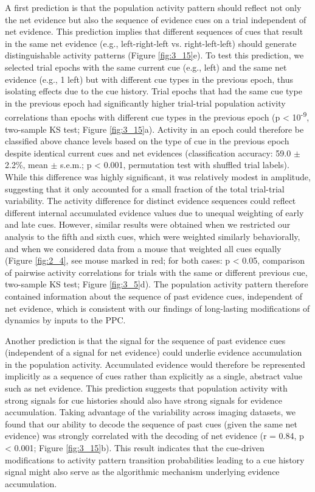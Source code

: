 \bigskip
A first prediction is that the population activity pattern should reflect not only the net evidence but also the sequence of evidence cues on a trial independent of net evidence. This prediction implies that different sequences of cues that result in the same net evidence (e.g., left-right-left vs. right-left-left) should generate distinguishable activity patterns (Figure \ref{fig:3_15}e). To test this prediction, we selected trial epochs with the same current cue (e.g., left) and the same net evidence (e.g., 1 left) but with different cue types in the previous epoch, thus isolating effects due to the cue history. Trial epochs that had the same cue type in the previous epoch had significantly higher trial-trial population activity correlations than epochs with different cue types in the previous epoch (p < 10\textsuperscript{-9}, two-sample KS test; Figure \ref{fig:3_15}a). Activity in an epoch could therefore be classified above chance levels based on the type of cue in the previous epoch despite identical current cues and net evidences (classification accuracy: 59.0 $\pm$ 2.2\%, mean $\pm$ s.e.m.; p < 0.001, permutation test with shuffled trial labels). While this difference was highly significant, it was relatively modest in amplitude, suggesting that it only accounted for a small fraction of the total trial-trial variability. The activity difference for distinct evidence sequences could reflect different internal accumulated evidence values due to unequal weighting of early and late cues. However, similar results were obtained when we restricted our analysis to the fifth and sixth cues, which were weighted similarly behaviorally, and when we considered data from a mouse that weighted all cues equally (Figure \ref{fig:2_4}, see mouse marked in red; for both cases: p < 0.05, comparison of pairwise activity correlations for trials with the same or different previous cue, two-sample KS test; Figure \ref{fig:3_5}d). The population activity pattern therefore contained information about the sequence of past evidence cues, independent of net evidence, which is consistent with our findings of long-lasting modifications of dynamics by inputs to the PPC.

\bigskip
Another prediction is that the signal for the sequence of past evidence cues (independent of a signal for net evidence) could underlie evidence accumulation in the population activity. Accumulated evidence would therefore be represented implicitly as a sequence of cues rather than explicitly as a single, abstract value such as net evidence. This prediction suggests that population activity with strong signals for cue histories should also have strong signals for evidence accumulation. Taking advantage of the variability across imaging datasets, we found that our ability to decode the sequence of past cues (given the same net evidence) was strongly correlated with the decoding of net evidence (r = 0.84, p < 0.001; Figure \ref{fig:3_15}b). This result indicates that the cue-driven modifications to activity pattern transition probabilities leading to a cue history signal might also serve as the algorithmic mechanism underlying evidence accumulation. 

